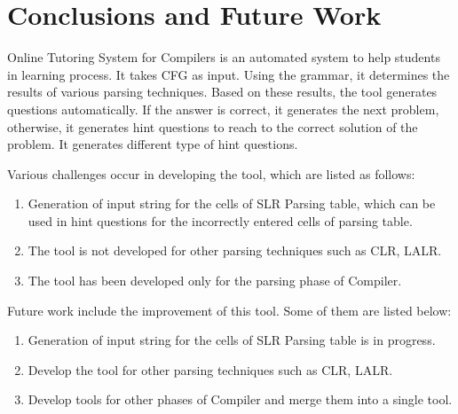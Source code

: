 \chapter{Conclusions and Future Work}
\label{chap:conclusion}
Online Tutoring System for Compilers is an automated system to help students in learning process. It takes CFG as input. Using the grammar, it determines the results of various parsing techniques. Based on these results, the tool generates questions automatically. If the answer is correct, it generates the next problem, otherwise, it generates hint questions to reach to the correct solution of the problem. It generates different type of hint questions.

Various challenges occur in developing the tool, which are listed as follows:
\begin{enumerate}
\item Generation of input string for the cells of SLR Parsing table, which can be used in hint questions for the incorrectly entered cells of parsing table.
\item The tool is not developed for other parsing techniques such as CLR, LALR.
\item The tool has been developed only for the parsing phase of Compiler.
\end{enumerate}

Future work include the improvement of this tool. Some of them are listed below:
\begin{enumerate}
\item Generation of input string for the cells of SLR Parsing table is in progress.
\item Develop the tool for other parsing techniques such as CLR, LALR.
\item Develop tools for other phases of Compiler and merge them into a single tool.
\end{enumerate}